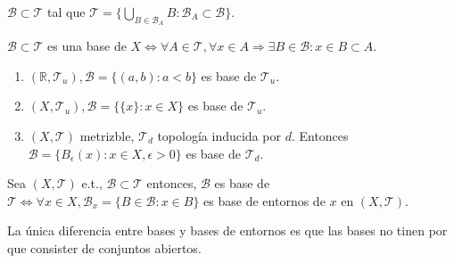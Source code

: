 \begin{obs}
  $\mathcal{B} \subset \mathcal{T}$ tal que $\mathcal{T} = \{ \bigcup_{B \in \mathcal{B}_{A}} B: \mathcal{B}_{A} \subset \mathcal{B} \}$.
\end{obs}

\begin{obs}
  $\mathcal{B} \subset \mathcal{T}$ es una base de $X \Leftrightarrow \forall A \in \mathcal{T}, \forall x \in A \Rightarrow \exists B  \in \mathcal{B} : x \in B \subset A$.
\end{obs}

\begin{ejm}
  \begin{enumerate}[label=(\roman*)]
    \item $( \mathbb{R} , \mathcal{T}_{u} ), \mathcal{B} = \{ ( a, b ) : a < b \}$ es base de $\mathcal{T}_{u}$.
    \item $( X, \mathcal{T}_{u} ), \mathcal{B} = \{ \{ x \} : x \in X \}$ es base de $\mathcal{T}_{u}$.
    \item $( X, \mathcal{T} )$ metrizble, $\mathcal{T}_{d}$ topología inducida por $d$. Entonces $\mathcal{B} = \{ B_{\epsilon}(x) : x \in X, \epsilon > 0 \}$ es base de $\mathcal{T}_{d}$.
  \end{enumerate}
\end{ejm}

\begin{prop}
  Sea $( X, \mathcal{T} )$ e.t., $\mathcal{B} \subset \mathcal{T}$ entonces, $\mathcal{B}$ es base de $\mathcal{T} \Leftrightarrow \forall x \in X, \mathcal{B}_{x} = \{ B \in \mathcal{B}: x \in B \}$ es base de entornos de $x$ en $( X, \mathcal{T} )$.
\end{prop}

\begin{obs}
  La única diferencia entre bases y bases de entornos es que las bases no tinen por que consister de conjuntos abiertos.
\end{obs}

